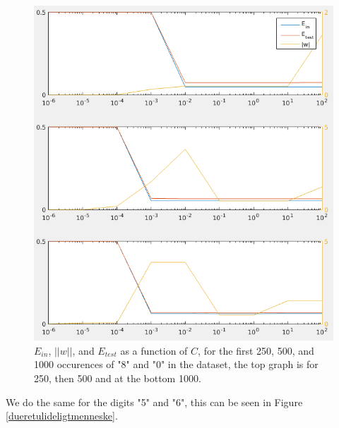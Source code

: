 \documentclass[a4paper]{article}
\begin{document}
\begin{figure}[H]
  \centering
  \includegraphics[width=\textwidth]{./08.png}
  \caption{$E_{in}$, $||w||$, and $E_{test}$ as a function of $C$, for the first 250, 500, and 1000 occurences of "8" and "0" in the dataset, the top graph is for 250, then 500 and at the bottom 1000.}
  \label{sutminfedepik}
\end{figure}
\noindent We do the same for the digits "5" and "6", this can be seen in Figure \ref{dueretulideligtmenneske}.
\end{document}
